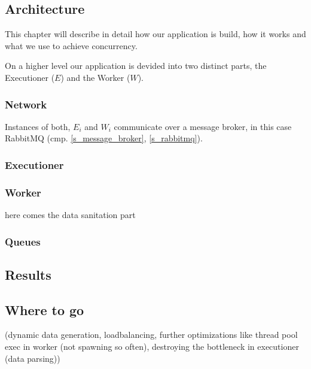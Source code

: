 \newpage

\subsection{Architecture}

This chapter will describe in detail how our application
is build, how it works and what we use to achieve
concurrency.

On a higher level our application is devided into two
distinct parts, the Executioner ($E$) and the Worker ($W$).

\subsubsection{Network}

Instances of both, $E_i$ and $W_i$ communicate over a
message broker, in this case RabbitMQ (cmp.
\ref{s_message_broker}, \ref{s_rabbitmq}).



\subsubsection{Executioner}


\subsubsection{Worker}

here comes the data sanitation part


\subsubsection{Queues}


\subsection{Results}

\subsection{Where to go}

(dynamic data generation, loadbalancing, further optimizations
like thread pool exec in worker (not spawning so often),
destroying the bottleneck in executioner (data parsing))
